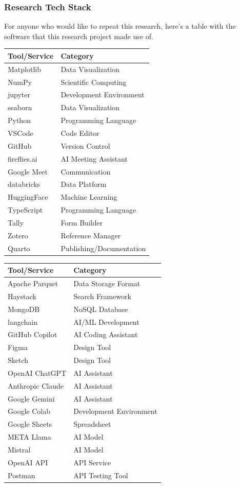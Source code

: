 \documentclass[
  letterpaper,
  DIV=11,
  numbers=noendperiod]{scrartcl}
\begin{document}
\subsubsection{Research Tech Stack}\label{research-tech-stack}

For anyone who would like to repeat this research, here's a table with
the software that this research project made use of.

\begin{longtable}[]{@{}ll@{}}
\toprule\noalign{}
Tool/Service & Category \\
\midrule\noalign{}
\endhead
\bottomrule\noalign{}
\endlastfoot
Matplotlib & Data Visualization \\
NumPy & Scientific Computing \\
jupyter & Development Environment \\
seaborn & Data Visualization \\
Python & Programming Language \\
VSCode & Code Editor \\
GitHub & Version Control \\
fireflies.ai & AI Meeting Assistant \\
Google Meet & Communication \\
databricks & Data Platform \\
HuggingFace & Machine Learning \\
TypeScript & Programming Language \\
Tally & Form Builder \\
Zotero & Reference Manager \\
Quarto & Publishing/Documentation \\
\end{longtable}

\begin{longtable}[]{@{}ll@{}}
\toprule\noalign{}
Tool/Service & Category \\
\midrule\noalign{}
\endhead
\bottomrule\noalign{}
\endlastfoot
Apache Parquet & Data Storage Format \\
Haystack & Search Framework \\
MongoDB & NoSQL Database \\
langchain & AI/ML Development \\
GitHub Copilot & AI Coding Assistant \\
Figma & Design Tool \\
Sketch & Design Tool \\
OpenAI ChatGPT & AI Assistant \\
Anthropic Claude & AI Assistant \\
Google Gemini & AI Assistant \\
Google Colab & Development Environment \\
Google Sheets & Spreadsheet \\
META Llama & AI Model \\
Mistral & AI Model \\
OpenAI API & API Service \\
Postman & API Testing Tool \\
\end{longtable}
\end{document}

